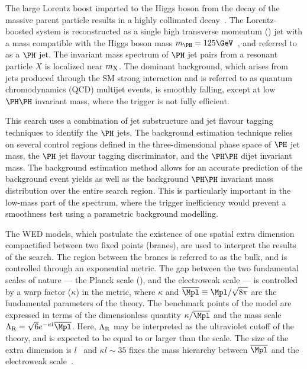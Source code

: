 The large Lorentz boost imparted to the Higgs boson from the decay of the massive parent particle results in a highly collimated \Hbb decay~\cite{Gouzevitch:2013qca,Cooper:2013kia, Butterworth:2008iy}. The Lorentz-boosted \Hbb system is reconstructed as a single high transverse momentum (\pt) jet with a mass compatible with the Higgs boson mass $\mH = 125\GeV$~\cite{Aad:2015zhl}, and referred to as a $\PH$ jet. 
The invariant mass spectrum of $\PH$ jet pairs from a resonant particle $X$ is localized near $m_{\text{X}}$. 
The dominant background, which arises from jets produced through the SM strong interaction and is referred to as quantum chromodynamics (QCD) multijet events, is smoothly falling, except at low $\PH\PH$ invariant mass, where the trigger is not fully efficient.

This search uses a combination of jet substructure and jet flavour tagging techniques to identify the $\PH$ jets.
The background estimation technique relies on several control regions defined in the three-dimensional phase space of $\PH$ jet mass, the $\PH$ jet flavour tagging discriminator, and the $\PH\PH$ dijet invariant mass. The background estimation method allows for an accurate prediction of the background event yields as well as the background $\PH\PH$ invariant mass distribution over the entire search region. This is particularly important in the low-mass part of the spectrum, where the trigger inefficiency would prevent a smoothness test using a parametric background modelling.

The WED models, which postulate the existence of one spatial extra dimension compactified between two fixed points (branes), are used to interpret the results of the search. The region between the branes is referred to as the bulk, and is controlled through an exponential metric. The gap between the two fundamental scales of nature --- the
Planck scale (\Mpl), and the electroweak scale --- is controlled by a warp factor ($\kappa$) in the metric, where $\kappa$ and $\overline{\Mpl} \equiv \Mpl /\sqrt{8\pi}$ are the fundamental parameters of the theory.
The benchmark points of the model are expressed in terms of the dimensionless
quantity $\kappa/\overline{\Mpl}$ and the mass scale $\LambdaR = \sqrt{6}
e^{-\kappa l} \overline{\Mpl}$.
Here, $\Lambda_{\text{R}}$ may be interpreted as the ultraviolet cutoff of the theory, and is expected to be equal to or larger than the \TeV scale. The size of the extra dimension is $l$~\cite{Giudice:2000av} and $\kappa l \sim 35$ fixes the mass hierarchy between $\overline{\Mpl}$ and the electroweak scale~\cite{Randall:1999ee}.


